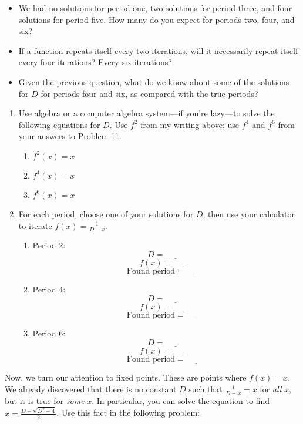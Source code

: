 \documentclass[../gatm.tex]{subfiles}
\begin{document}
\begin{itemize}
\item We had no solutions for period one, two solutions for period three, and four solutions for period five. How many do you expect for periods two, four, and six?
\item If a function repeats itself every two iterations, will it necessarily repeat itself every four iterations? Every six iterations?
\item Given the previous question, what do we know about some of the solutions for $D$ for periods four and six, as compared with the true periods?
\end{itemize}
\begin{enumerate}
\item Use algebra or a computer algebra system---if you're lazy---to solve the following equations for $D$. Use $f^2$ from my writing above; use $f^4$ and $f^6$ from your answers to Problem 11.
\begin{multicols}{3}
\begin{enumerate}
\item $f^2(x)=x$
\item $f^4(x)=x$
\item $f^6(x)=x$
\end{enumerate}
\end{multicols}
\item For each period, choose one of your solutions for $D$, then use your calculator to iterate $f(x)=\frac{1}{D-x}$.
\begin{multicols}{3}
\begin{enumerate}
\item Period 2: $$D=\underline{\phantom{00000}}$$ $$f(x)=\underline{\phantom{00000}}$$ $$\text{Found period}=\underline{\phantom{00000}}$$
\item Period 4: $$D=\underline{\phantom{00000}}$$ $$f(x)=\underline{\phantom{00000}}$$ $$\text{Found period}=\underline{\phantom{00000}}$$
\item Period 6: $$D=\underline{\phantom{00000}}$$ $$f(x)=\underline{\phantom{00000}}$$ $$\text{Found period}=\underline{\phantom{00000}}$$
\end{enumerate}
\end{multicols}
\end{enumerate}

Now, we turn our attention to fixed points. These are points where $f(x)=x$. We already discovered that there is no constant $D$ such that $\frac{1}{D-x}=x$ for \textit{all} $x$, but it is true for \textit{some} $x$. In particular, you can solve the equation to find $x=\frac{D\pm \sqrt{D^2-4}}{2}$. Use this fact in the following problem:
\end{document}
